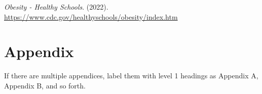 \documentclass[
  jou,
  colorlinks=true,linkcolor=blue,citecolor=blue,urlcolor=blue]{apa7}
\newlength{\cslhangindent}
\newlength{\cslentryspacingunit} %
\newenvironment{CSLReferences}[2] %
 {%
  \setlength{\parindent}{0pt}
  \ifodd #1
  \let\oldpar\par
  \def\par{\hangindent=\cslhangindent\oldpar}
  \fi
  \setlength{\parskip}{#2\cslentryspacingunit}
 }%
 {}
\begin{document}
\hypertarget{refs}{}
\begin{CSLReferences}{1}{0}
\leavevmode{}%
\emph{Obesity - {Healthy Schools}}. (2022).
\url{https://www.cdc.gov/healthyschools/obesity/index.htm}

\end{CSLReferences}

\newpage{}

\hypertarget{appendix}{%
\section{Appendix}\label{appendix}}

If there are multiple appendices, label them with level 1 headings as
Appendix A, Appendix B, and so forth.
\end{document}

